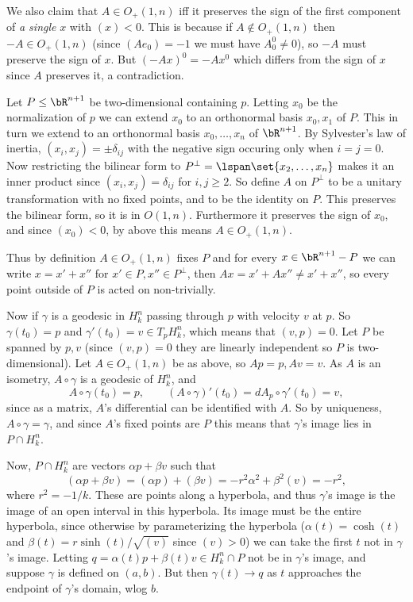     We also claim that $A\in O_+(1,n)$ iff it preserves the sign of the first component of {\it a single\/} $x$ with $(x)<0$.
    This is because if $A\notin O_+(1,n)$ then $-A\in O_+(1,n)$ (since $(Ae_0)=-1$ we must have $A^0_0\neq0$), so $-A$ must preserve the sign of $x$.
    But $(-Ax)^0=-Ax^0$ which differs from the sign of $x$ since $A$ preserves it, a contradiction.

    Let $P\leq\bR^{n+1}$ be two-dimensional containing $p$.
    Letting $x_0$ be the normalization of $p$ we can extend $x_0$ to an orthonormal basis $x_0,x_1$ of $P$.
    This in turn we extend to an orthonormal basis $x_0,\dots,x_n$ of $\bR^{n+1}$.
    By Sylvester's law of inertia, $(x_i,x_j)=\pm\delta_{ij}$ with the negative sign occuring only when $i=j=0$.
    Now restricting the bilinear form to $P^\perp=\lspan\set{x_2,\dots,x_n}$ makes it an inner product since $(x_i,x_j)=\delta_{ij}$ for $i,j\geq2$.
    So define $A$ on $P^\perp$ to be a unitary transformation with no fixed points, and to be the identity on $P$.
    This preserves the bilinear form, so it is in $O(1,n)$.
    Furthermore it preserves the sign of $x_0$, and since $(x_0)<0$, by above this means $A\in O_+(1,n)$.

    Thus by definition $A\in O_+(1,n)$ fixes $P$ and for every $x\in\bR^{n+1}-P$ we can write $x=x'+x''$ for $x'\in P,x''\in P^\perp$,
    then $Ax=x'+Ax''\neq x'+x''$, so every point outside of $P$ is acted on non-trivially.

    Now if $\gamma$ is a geodesic in $H^n_k$ passing through $p$ with velocity $v$ at $p$.
    So $\gamma(t_0)=p$ and $\gamma'(t_0)=v\in T_pH^n_k$, which means that $(v,p)=0$.
    Let $P$ be spanned by $p,v$ (since $(v,p)=0$ they are linearly independent so $P$ is two-dimensional).
    Let $A\in O_+(1,n)$ be as above, so $Ap=p,Av=v$.
    As $A$ is an isometry, $A\circ\gamma$ is a geodesic of $H^n_k$, and
    $$ A\circ\gamma(t_0) = p,\qquad (A\circ\gamma)'(t_0) = dA_p\circ\gamma'(t_0) = v,  $$
    since as a matrix, $A$'s differential can be identified with $A$.
    So by uniqueness, $A\circ\gamma=\gamma$, and since $A$'s fixed points are $P$ this means that $\gamma$'s image lies in $P\cap H^n_k$.

    Now, $P\cap H^n_k$ are vectors $\alpha p+\beta v$ such that
    $$ (\alpha p+\beta v) = (\alpha p) + (\beta v) = -r^2\alpha^2 + \beta^2(v) = -r^2 , $$
    where $r^2=-1/k$.
    These are points along a hyperbola, and thus $\gamma$'s image is the image of an open interval in this hyperbola.
    Its image must be the entire hyperbola, since otherwise by parameterizing the hyperbola ($\alpha(t)=\cosh(t)$ and $\beta(t)=r\sinh(t)/\sqrt{(v)}$ since $(v)>0$) we can take the
    first $t$ not in $\gamma$'s image.
    Letting $q=\alpha(t)p+\beta(t)v\in H^n_k\cap P$ not be in $\gamma$'s image, and suppose $\gamma$ is defined on $(a,b)$.
    But then $\gamma(t)\to q$ as $t$ approaches the endpoint of $\gamma$'s domain, wlog $b$.

